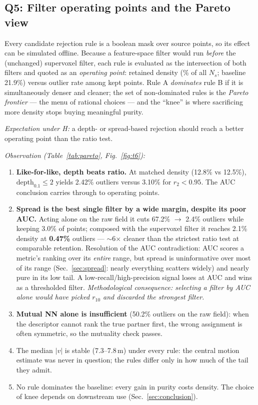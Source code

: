 \documentclass[11pt,a4paper]{article}
\newcommand{\Ns}{N_s}
\newcommand{\vv}{\lvert v\rvert}
\begin{document}
\subsection{Q5: Filter operating points and the Pareto view}
\label{sec:pareto}

Every candidate rejection rule is a boolean mask over source points, so its
effect can be simulated offline. Because a feature-space filter would run
\emph{before} the (unchanged) supervoxel filter, each rule is evaluated as
the intersection of both filters and quoted as an \emph{operating point}:
retained density (\% of all $\Ns$; baseline 21.9\%) versus outlier rate
among kept points. Rule A \emph{dominates} rule B if it is simultaneously
denser and cleaner; the set of non-dominated rules is the \emph{Pareto
frontier} --- the menu of rational choices --- and the ``knee'' is where
sacrificing more density stops buying meaningful purity.

\emph{Expectation under H:} a depth- or spread-based rejection should reach
a better operating point than the ratio test.

\emph{Observation (Table~\ref{tab:pareto}, Fig.~\ref{fig:t6}):}

\begin{enumerate}
  \item \textbf{Like-for-like, depth beats ratio.} At matched density
  (12.8\% vs 12.5\%), $\mathrm{depth}_{0.1}\le2$ yields 2.42\% outliers
  versus 3.10\% for $r_2<0.95$. The AUC conclusion carries through to
  operating points.
  \item \textbf{Spread is the best single filter by a wide margin, despite
  its poor AUC.} Acting alone on the raw field it cuts 67.2\% $\to$ 2.4\%
  outliers while keeping 3.0\% of points; composed with the supervoxel
  filter it reaches 2.1\% density at \textbf{0.47\%} outliers ---
  $\sim$6$\times$ cleaner than the strictest ratio test at comparable
  retention. Resolution of the AUC contradiction: AUC scores a metric's
  ranking over its \emph{entire} range, but spread is uninformative over
  most of its range (Sec.~\ref{sec:spread}: nearly everything scatters
  widely) and nearly pure in its low tail. A low-recall/high-precision
  signal loses at AUC and wins as a thresholded filter.
  \emph{Methodological consequence: selecting a filter by AUC alone would
  have picked $r_{10}$ and discarded the strongest filter.}
  \item \textbf{Mutual NN alone is insufficient} (50.2\% outliers on the
  raw field): when the descriptor cannot rank the true partner first, the
  wrong assignment is often symmetric, so the mutuality check passes.
  \item The median $\vv$ is stable (7.3--7.8\,m) under every rule: the
  central motion estimate was never in question; the rules differ only in
  how much of the tail they admit.
  \item No rule dominates the baseline: every gain in purity costs
  density. The choice of knee depends on downstream use
  (Sec.~\ref{sec:conclusion}).
\end{enumerate}
\end{document}
